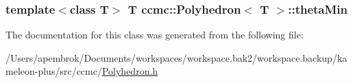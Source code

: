 \hypertarget{classccmc_1_1_polyhedron_a6f7b5d5e06047d56e6ec6c01ce992041}{
\subsubsection[{theta\-Min}]{\setlength{\rightskip}{0pt plus 5cm}template$<$class T$>$ T {\bf ccmc\-::\-Polyhedron}$<$ T $>$\-::theta\-Min}}\label{classccmc_1_1_polyhedron_a6f7b5d5e06047d56e6ec6c01ce992041}


The documentation for this class was generated from the following file\-:\begin{DoxyCompactItemize}
\item 
/\-Users/apembrok/\-Documents/workspaces/workspace.\-bak2/workspace.\-backup/kameleon-\/plus/src/ccmc/\hyperlink{_polyhedron_8h}{Polyhedron.\-h}\end{DoxyCompactItemize}
